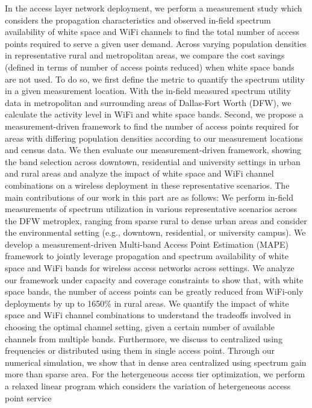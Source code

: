 In the access layer network deployment, we perform a measurement study 
which considers the propagation characteristics and observed in-field 
spectrum availability of white space and WiFi channels to find the total 
number of access points required to serve a given user demand. Across 
varying population densities in representative rural and metropolitan 
areas, we compare the cost savings (defined in terms of number of access 
points reduced) when white space bands are not used. To do so, we first 
define the metric to quantify the spectrum utility in a given measurement 
location. With the in-field measured spectrum utility data in metropolitan 
and surrounding areas of Dallas-Fort Worth (DFW), we calculate the 
activity level in WiFi and white space bands. Second, we propose a 
measurement-driven framework to find the number of access points required 
for areas with differing population densities according to our measurement 
locations and census data. We then evaluate our measurement-driven framework, 
showing the band selection across downtown, residential and university 
settings in urban and rural areas and analyze the impact of white space 
and WiFi channel combinations on a wireless deployment in these 
representative scenarios. 
The main contributions of our work in this part are as follows: We perform in-field 
measurements of spectrum utilization in various representative scenarios 
across the DFW metroplex, ranging from sparse rural to dense urban areas 
and consider the environmental setting (e.g., downtown, residential, or 
university campus). We develop a measurement-driven Multi-band Access 
Point Estimation (MAPE) framework to jointly leverage propagation and 
spectrum availability of white space and WiFi bands for wireless access 
networks across settings. We analyze our framework under capacity and 
coverage constraints to show that, with white space bands, the number 
of access points can be greatly reduced from WiFi-only deployments by 
up to 1650\% in rural areas. We quantify the impact of white space and 
WiFi channel combinations to understand the tradeoffs involved in choosing 
the optimal channel setting, given a certain number of available channels 
from multiple bands. Furthermore, we discuss to centralized using frequencies 
or distributed using them in single access point. Through our numerical 
simulation, we show that in dense area centralized using spectrum gain 
more than sparse area.
For the hetergeneous access tier optimization, we perform a relaxed linear 
program which considers the variation of hetergeneous access point service 

